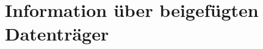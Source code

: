 \chapter{Information über beigefügten Datenträger}
\label{chap:InformationUeberBeigefuegtenDatentraeger}
